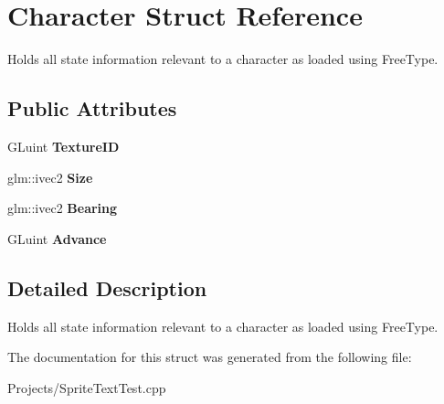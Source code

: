 \hypertarget{structCharacter}{\section{Character Struct Reference}
\label{structCharacter}
}


Holds all state information relevant to a character as loaded using Free\-Type.  


\subsection*{Public Attributes}
\begin{DoxyCompactItemize}
\item 
\hypertarget{structCharacter_a51d894cc31d79e95fe1a47fb65c6e889}{G\-Luint {\bfseries Texture\-I\-D}}\label{structCharacter_a51d894cc31d79e95fe1a47fb65c6e889}

\item 
\hypertarget{structCharacter_aaaa598050e0ef590fe6903fd2bab40b8}{glm\-::ivec2 {\bfseries Size}}\label{structCharacter_aaaa598050e0ef590fe6903fd2bab40b8}

\item 
\hypertarget{structCharacter_afef98bf9c7f5313d96476f6f3f85f872}{glm\-::ivec2 {\bfseries Bearing}}\label{structCharacter_afef98bf9c7f5313d96476f6f3f85f872}

\item 
\hypertarget{structCharacter_ab35bae8be6740729fc5839c237a659f6}{G\-Luint {\bfseries Advance}}\label{structCharacter_ab35bae8be6740729fc5839c237a659f6}

\end{DoxyCompactItemize}


\subsection{Detailed Description}
Holds all state information relevant to a character as loaded using Free\-Type. 

The documentation for this struct was generated from the following file\-:\begin{DoxyCompactItemize}
\item 
Projects/Sprite\-Text\-Test.\-cpp\end{DoxyCompactItemize}
